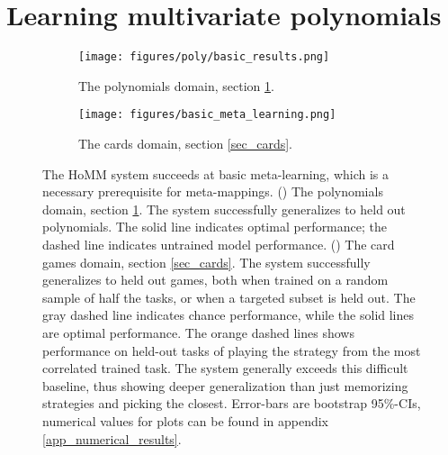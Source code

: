 \documentclass{article}
\begin{document}
\section{Learning multivariate polynomials} \label{sec_poly}
\vspace{-0.8em}
\begin{figure}[t]
\centering
\begin{subfigure}[t]{0.5\textwidth}
\texttt{[image: figures/poly/basic\_results.png]}
\caption{The polynomials domain, section \ref{sec_poly}.}
\label{poly_basic_results}
\end{subfigure}%
\begin{subfigure}[t]{0.5\textwidth}
\texttt{[image: figures/basic\_meta\_learning.png]}
\caption{The cards domain, section \ref{sec_cards}.}
\label{cards_basic_results}
\end{subfigure}%
\caption{The HoMM system succeeds at basic meta-learning, which is a necessary prerequisite for meta-mappings. () The polynomials domain, section \ref{sec_poly}. The system successfully generalizes to held out polynomials. The solid line indicates optimal performance; the dashed line indicates untrained model performance. () The card games domain, section \ref{sec_cards}. The system successfully generalizes to held out games, both when trained on a random sample of half the tasks, or when a targeted subset is held out. The gray dashed line indicates chance performance, while the solid lines are optimal performance. The orange dashed lines shows performance on held-out tasks of playing the strategy from the most correlated trained task. The system generally exceeds this difficult baseline, thus showing deeper generalization than just memorizing strategies and picking the closest. Error-bars are bootstrap 95\%-CIs, numerical values for plots can be found in appendix \ref{app_numerical_results}.}
\vspace{-0.5em}
\end{figure}
\end{document}
